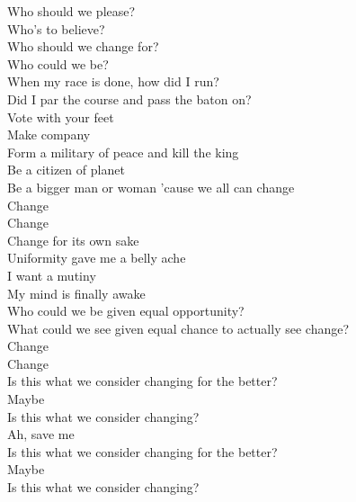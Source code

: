 \label{album:changes}




Who should we please? \\
Who's to believe? \\
Who should we change for? \\
Who could we be? \\
When my race is done, how did I run? \\
Did I par the course and pass the baton on? \\

Vote with your feet \\
Make company \\
Form a military of peace and kill the king \\
Be a citizen of planet  \\
Be a bigger man or woman 'cause we all can change \\

Change \\
Change \\

Change for its own sake \\
Uniformity gave me a belly ache \\
I want a mutiny \\
My mind is finally awake \\
Who could we be given equal opportunity? \\
What could we see given equal chance to actually see change? \\

Change \\
Change \\

Is this what we consider changing for the better? \\
Maybe \\

Is this what we consider changing? \\
Ah, save me \\
Is this what we consider changing for the better? \\
Maybe \\
Is this what we consider changing? \\

